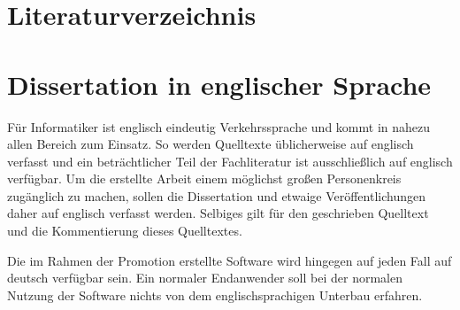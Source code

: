 \documentclass[paper=a4,fontsize=11pt,parskip=half]{scrartcl}
\begin{document}
\newpage

\section{Literaturverzeichnis}
\printbibliography[heading=none]

\newpage
\appendix

\section{Dissertation in englischer Sprache}

Für Informatiker ist englisch eindeutig Verkehrssprache und kommt in nahezu allen Bereich zum Einsatz. So werden Quelltexte üblicherweise auf englisch verfasst und ein beträchtlicher Teil der Fachliteratur ist ausschließlich auf englisch verfügbar. Um die erstellte Arbeit einem möglichst großen Personenkreis zugänglich zu machen, sollen die Dissertation und etwaige Veröffentlichungen daher auf englisch verfasst werden. Selbiges gilt für den geschrieben Quelltext und die Kommentierung dieses Quelltextes.

Die im Rahmen der Promotion erstellte Software wird hingegen auf jeden Fall auf deutsch verfügbar sein. Ein normaler Endanwender soll bei der normalen Nutzung der Software nichts von dem englischsprachigen Unterbau erfahren.
\end{document}
